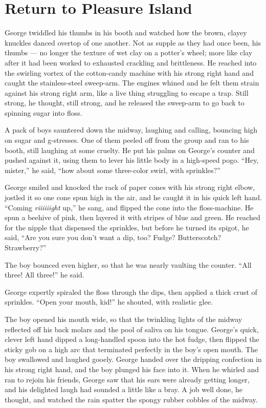 \section{Return to Pleasure Island}

George twiddled his thumbs in his booth and watched how the brown,
clayey knuckles danced overtop of one another. Not as supple as
they had once been, his thumbs --- no longer the texture of wet
clay on a potter's wheel; more like clay after it had been worked
to exhausted crackling and brittleness. He reached into the
swirling vortex of the cotton-candy machine with his strong right
hand and caught the stainless-steel sweep-arm. The engines whined
and he felt them strain against his strong right arm, like a live
thing struggling to escape a trap. Still strong, he thought, still
strong, and he released the sweep-arm to go back to spinning sugar
into floss.

A pack of boys sauntered down the midway, laughing and calling,
bouncing high on sugar and g-stresses. One of them peeled off from
the group and ran to his booth, still laughing at some cruelty. He
put his palms on George's counter and pushed against it, using them
to lever his little body in a high-speed pogo. ``Hey, mister,'' he
said, ``how about some three-color swirl, with sprinkles?''

George smiled and knocked the rack of paper cones with his strong
right elbow, jostled it so one cone spun high in the air, and he
caught it in his quick left hand. ``Coming \emph{riiiiiight} up,''
he sang, and flipped the cone into the floss-machine. He spun a
beehive of pink, then layered it with stripes of blue and green. He
reached for the nipple that dispensed the sprinkles, but before he
turned its spigot, he said,
``Are you sure you don't want a dip, too? Fudge? Butterscotch? Strawberry?''

The boy bounced even higher, so that he was nearly vaulting the
counter. ``All three! All three!'' he said.

George expertly spiraled the floss through the dips, then applied a
thick crust of sprinkles. ``Open your mouth, kid!'' he shouted,
with realistic glee.

The boy opened his mouth wide, so that the twinkling lights of the
midway reflected off his back molars and the pool of saliva on his
tongue. George's quick, clever left hand dipped a long-handled
spoon into the hot fudge, then flipped the sticky gob on a high arc
that terminated perfectly in the boy's open mouth. The boy
swallowed and laughed gooely. George handed over the dripping
confection in his strong right hand, and the boy plunged his face
into it. When he whirled and ran to rejoin his friends, George saw
that his ears were already getting longer, and his delighted laugh
had sounded a little like a bray. A job well done, he thought, and
watched the rain spatter the spongy rubber cobbles of the midway.

